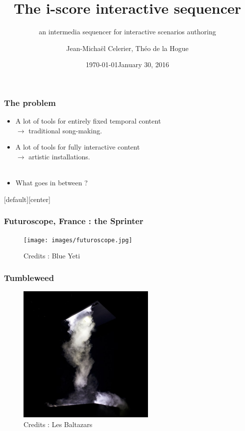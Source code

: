 \documentclass{beamer}
\title{The i-score interactive sequencer}
\subtitle{an intermedia sequencer for interactive scenarios authoring}
\date{\today}
\author{Jean-Michaël Celerier, Théo de la Hogue}
\institute{LaBRI, Blue Yeti, GMEA }
\date{January 30, 2016}
\begin{document}
    
\maketitle

\begin{frame}
    \frametitle{The problem}    
    \Large
    \begin{itemize}
    	\item<1-> A lot of tools for entirely fixed temporal content \\ $\rightarrow$ traditional song-making.
    	\item<2-> A lot of tools for fully interactive content  \\  $\rightarrow$ artistic installations.~\\~\\
    	\item<3-> What goes in between ?    	
    \end{itemize}    
\end{frame}

[default][center]
\begin{frame}
    \frametitle{Futuroscope, France : the Sprinter}        

    \begin{figure}
        \centering
        \texttt{[image: images/futuroscope.jpg]}
        \caption{Credits : Blue Yeti}
    \end{figure}
\end{frame}


\begin{frame}
    \frametitle{Tumbleweed}       
    
    \begin{figure}
    	\centering
    	\includegraphics[width=0.6\textwidth]{images/tumbleweed.jpg}
    	\caption{Credits : Les Baltazars}
    \end{figure}
\end{frame}
\end{document}
